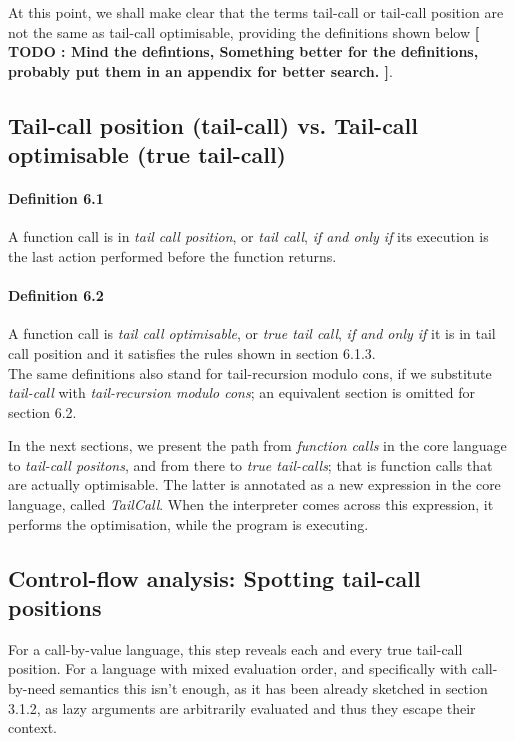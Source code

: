 \documentclass[diploma]{softlab-thesis}
\begin{document}
At this point, we shall make clear that the terms tail-call or tail-call position are not the same 
as tail-call optimisable, providing the definitions shown below \textbf{[ TODO : Mind the defintions, Something better 
for the definitions, probably put them in an appendix for better search. ]}.

\subsection{Tail-call position (tail-call) vs. Tail-call optimisable (true tail-call)}

\paragraph{Definition 6.1}
A function call is in \textit{tail call position}, or \textit{tail call}, \textit{if and only if} its execution is the last action 
performed before the function returns.

\paragraph{Definition 6.2}
A function call is \textit{tail call optimisable}, or \textit{true tail call}, \textit{if and only if} it is in tail call position and it satisfies the rules shown in 
section 6.1.3.\\

The same definitions also stand for tail-recursion modulo cons, if we substitute \textit{tail-call} with 
\textit{tail-recursion modulo cons}; an equivalent section is omitted for section 6.2.

In the next sections, we present the path from \textit{function calls} in the core language to \textit{tail-call positons}, 
and from there to \textit{true tail-calls}; that is function calls that are actually optimisable. The latter is annotated as a new 
expression in the core language, called \textit{TailCall}. When the interpreter comes across this expression, it performs the 
optimisation, while the program is executing.

\subsection{Control-flow analysis: Spotting tail-call positions}

For a call-by-value language, this step reveals each and every true tail-call position. For a language with mixed evaluation order, and specifically 
with call-by-need semantics this isn't enough, as it has been already sketched in section 3.1.2, as lazy arguments are arbitrarily evaluated and thus 
they escape their context. 
\end{document}

